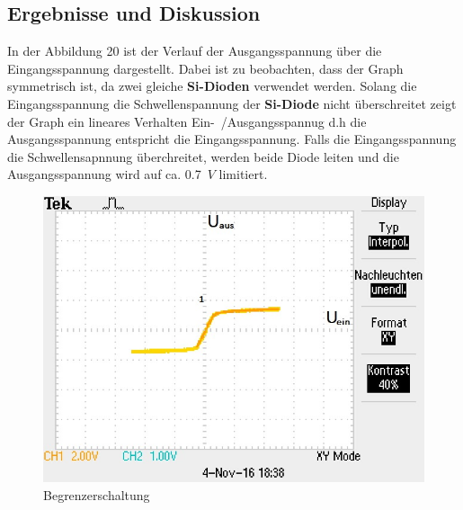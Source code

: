 \subsection{Ergebnisse und Diskussion}
In der Abbildung 20 ist der Verlauf der Ausgangsspannung \"uber die Eingangsspannung dargestellt. Dabei ist zu beobachten, dass der Graph symmetrisch ist, da zwei gleiche \textbf{Si-Dioden} verwendet werden. Solang die Eingangsspannung die Schwellenspannung der \textbf{Si-Diode} nicht \"uberschreitet zeigt der Graph ein lineares Verhalten Ein-~/Ausgangsspannug d.h die Ausgangsspannung entspricht die Eingangsspannung. Falls die Eingangsspannung  die Schwellensapnnung \"uberchreitet, werden beide Diode leiten und die Ausgangsspannung wird auf ca. 0.7~$V$ limitiert.
\begin{figure}[!ht]
\begin{center}
\includegraphics[scale=0.8]{Versuch4/TEK0003}
\caption{Begrenzerschaltung}
\end{center}
\end{figure}

